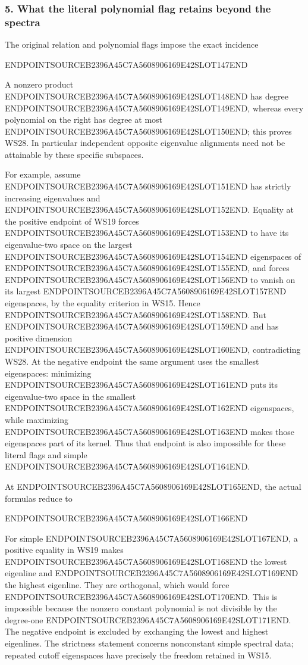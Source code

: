 \subsubsection{5. What the literal polynomial flag retains beyond the spectra}\label{endpoint-window_review--what-the-literal-polynomial-flag-retains-beyond-the-spectra}

The original relation and polynomial flags impose the exact incidence

ENDPOINTSOURCEB2396A45C7A5608906169E42SLOT147END

A nonzero product ENDPOINTSOURCEB2396A45C7A5608906169E42SLOT148END has degree ENDPOINTSOURCEB2396A45C7A5608906169E42SLOT149END, whereas every polynomial on the right has degree at most ENDPOINTSOURCEB2396A45C7A5608906169E42SLOT150END; this proves WS28. In particular independent opposite eigenvalue alignments need not be attainable by these specific subspaces.

For example, assume ENDPOINTSOURCEB2396A45C7A5608906169E42SLOT151END has strictly increasing eigenvalues and ENDPOINTSOURCEB2396A45C7A5608906169E42SLOT152END. Equality at the positive endpoint of WS19 forces ENDPOINTSOURCEB2396A45C7A5608906169E42SLOT153END to have its eigenvalue-two space on the largest ENDPOINTSOURCEB2396A45C7A5608906169E42SLOT154END eigenspaces of ENDPOINTSOURCEB2396A45C7A5608906169E42SLOT155END, and forces ENDPOINTSOURCEB2396A45C7A5608906169E42SLOT156END to vanish on its largest ENDPOINTSOURCEB2396A45C7A5608906169E42SLOT157END eigenspaces, by the equality criterion in WS15. Hence ENDPOINTSOURCEB2396A45C7A5608906169E42SLOT158END. But ENDPOINTSOURCEB2396A45C7A5608906169E42SLOT159END and has positive dimension ENDPOINTSOURCEB2396A45C7A5608906169E42SLOT160END, contradicting WS28. At the negative endpoint the same argument uses the smallest eigenspaces: minimizing ENDPOINTSOURCEB2396A45C7A5608906169E42SLOT161END puts its eigenvalue-two space in the smallest ENDPOINTSOURCEB2396A45C7A5608906169E42SLOT162END eigenspaces, while maximizing ENDPOINTSOURCEB2396A45C7A5608906169E42SLOT163END makes those eigenspaces part of its kernel. Thus that endpoint is also impossible for these literal flags and simple ENDPOINTSOURCEB2396A45C7A5608906169E42SLOT164END.

At ENDPOINTSOURCEB2396A45C7A5608906169E42SLOT165END, the actual formulas reduce to

ENDPOINTSOURCEB2396A45C7A5608906169E42SLOT166END

For simple ENDPOINTSOURCEB2396A45C7A5608906169E42SLOT167END, a positive equality in WS19 makes ENDPOINTSOURCEB2396A45C7A5608906169E42SLOT168END the lowest eigenline and ENDPOINTSOURCEB2396A45C7A5608906169E42SLOT169END the highest eigenline. They are orthogonal, which would force ENDPOINTSOURCEB2396A45C7A5608906169E42SLOT170END. This is impossible because the nonzero constant polynomial is not divisible by the degree-one ENDPOINTSOURCEB2396A45C7A5608906169E42SLOT171END. The negative endpoint is excluded by exchanging the lowest and highest eigenlines. The strictness statement concerns nonconstant simple spectral data; repeated cutoff eigenspaces have precisely the freedom retained in WS15.

